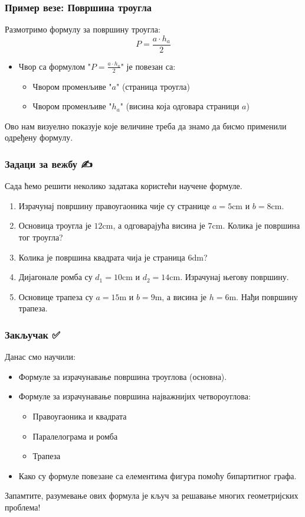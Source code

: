 \documentclass{beamer}
\begin{document}
\begin{frame}
\frametitle{Пример везе: Површина троугла}
Размотримо формулу за површину троугла:
$$P = \frac{a \cdot h_a}{2}$$
\begin{itemize}
    \item Чвор са формулом "$P = \frac{a \cdot h_a}{2}$" је повезан са:
    \begin{itemize}
        \item Чвором променљиве "$a$" (страница троугла)
        \item Чвором променљиве "$h_a$" (висина која одговара страници $a$)
    \end{itemize}
\end{itemize}
Ово нам визуелно показује које величине треба да знамо да бисмо применили одређену формулу.
\end{frame}

\begin{frame}
\frametitle{Задаци за вежбу ✍️}
Сада ћемо решити неколико задатака користећи научене формуле.
\begin{enumerate}
    \item Израчунај површину правоугаоника чије су странице $a=5\text{cm}$ и $b=8\text{cm}$.
    \item Основица троугла је $12\text{cm}$, а одговарајућа висина је $7\text{cm}$. Колика је површина тог троугла?
    \item Колика је површина квадрата чија је страница $6\text{dm}$?
    \item Дијагонале ромба су $d_1=10\text{cm}$ и $d_2=14\text{cm}$. Израчунај његову површину.
    \item Основице трапеза су $a=15\text{m}$ и $b=9\text{m}$, а висина је $h=6\text{m}$. Нађи површину трапеза.
\end{enumerate}
\end{frame}

\begin{frame}
\frametitle{Закључак ✅}
Данас смо научили:
\begin{itemize}
    \item Формуле за израчунавање површина троуглова (основна).
    \item Формуле за израчунавање површина најважнијих четвороуглова:
    \begin{itemize}
        \item Правоугаоника и квадрата
        \item Паралелограма и ромба
        \item Трапеза
    \end{itemize}
    \item Како су формуле повезане са елементима фигура помоћу бипартитног графа.
\end{itemize}
Запамтите, разумевање ових формула је кључ за решавање многих геометријских проблема!
\end{frame}
\end{document}
